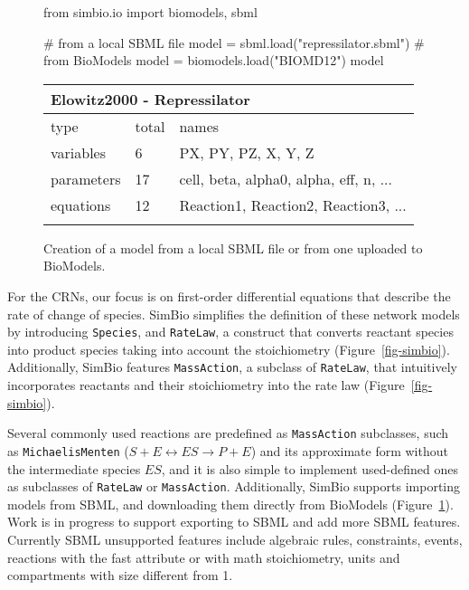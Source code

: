 \documentclass[namedate,numsec,webpdf,modern,large]{oup-authoring-template}
\theoremstyle{thmstyleone}%
\theoremstyle{thmstyletwo}%
\theoremstyle{thmstylethree}%
\newenvironment{CodeInput}{\begin{tcolorbox}[title=input,boxrule=0pt]}{\end{tcolorbox}}
\newenvironment{CodeOutput}{\begin{tcolorbox}[title=output,boxrule=0pt]}{\end{tcolorbox}}
\newcommand{\KeywordTok}[1]{\textcolor[rgb]{0.00,0.13,1.00}{#1}}
\newcommand{\ClassTok}[1]{\textcolor[rgb]{0.27,0.56,0.65}{#1}}
\newcommand{\OperatorTok}[1]{\textcolor[rgb]{0.00,0.00,0.00}{#1}}
\newcommand{\VariableTok}[1]{\textcolor[rgb]{0.00,0.06,0.50}{#1}}
\newcommand{\FunctionTok}[1]{\textcolor[rgb]{0.47,0.37,0.15}{#1}}
\newcommand{\CommentTok}[1]{\textcolor[rgb]{0.00,0.50,0.00}{#1}}
\newcommand{\StringTok}[1]{\textcolor[rgb]{0.70,0.27,0.27}{#1}}
\begin{document}
\begin{figure}[t]
  \centering
  
  \begin{CodeInput}
\begin{Highlighting}[]
\KeywordTok{from} \ClassTok{simbio.io} \KeywordTok{import} \ClassTok{biomodels}, \ClassTok{sbml}

\CommentTok{\# from a local SBML file}
\VariableTok{model} \OperatorTok{=} \ClassTok{sbml}.\FunctionTok{load}\KeywordTok{(}\StringTok{"repressilator.sbml"}\KeywordTok{)}
\CommentTok{\# from BioModels}
\VariableTok{model} \OperatorTok{=} \ClassTok{biomodels}.\FunctionTok{load}\KeywordTok{(}\StringTok{"BIOMD12"}\KeywordTok{)}
\VariableTok{model}
\end{Highlighting}
  \end{CodeInput}
    
  \begin{CodeOutput}
      \begin{tabular}{@{}lll@{}}
          \multicolumn{3}{l}{Elowitz2000 - Repressilator} \\
          \toprule
          type & total & names \\
          \midrule
          variables  &  6 & PX, PY, PZ, X, Y, Z \\
          parameters & 17 & cell, beta, alpha0, alpha, eff, n, ... \\
          equations  & 12 & Reaction1, Reaction2, Reaction3, ... \\
          \botrule
      \end{tabular}
  \end{CodeOutput}
  
  \caption{Creation of a model from a local SBML file or from one uploaded to BioModels.}
  \label{fig-simbio-io}
\end{figure}

For the \acp{CRN},
our focus is on first-order differential equations that describe the rate of change of species.
SimBio simplifies the definition of these network models by introducing \texttt{Species},
and \texttt{RateLaw}, a construct that converts reactant species into product species taking into account the stoichiometry (Figure~\ref{fig-simbio}).
Additionally, SimBio features \texttt{MassAction},
a subclass of \texttt{RateLaw},
that intuitively incorporates reactants and their stoichiometry into the rate law (Figure~\ref{fig-simbio}).

Several commonly used reactions are predefined as \texttt{MassAction} subclasses,
such as \texttt{MichaelisMenten} (\(S + E \leftrightarrow ES \rightarrow P + E\))
and its approximate form without the intermediate species \(ES\),
and it is also simple to implement used-defined ones
as subclasses of \texttt{RateLaw} or \texttt{MassAction}.
Additionally, SimBio supports importing models from \ac{SBML},
and downloading them directly from BioModels \citep{malik-sheriffBioModels15Years2020} (Figure~\ref{fig-simbio-io}).
Work is in progress to support exporting to \ac{SBML} and add more \ac{SBML} features.
Currently \ac{SBML} unsupported features include
algebraic rules, constraints, events, reactions with the fast attribute or with math stoichiometry,
units and compartments with size different from 1.
\end{document}

